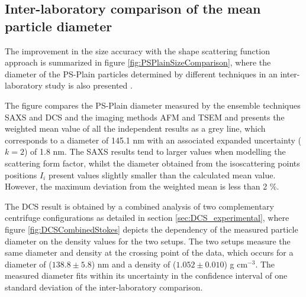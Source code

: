 \subsection{Inter-laboratory comparison of the mean particle diameter}
\label{sec:interlab_size_comparison}
The improvement in the size accuracy with the shape scattering function approach is summarized in figure \ref{fig:PSPlainSizeComparison}, where the diameter of the PS-Plain particles determined by different techniques in an inter-laboratory study is also presented \citep{nicolet_inter-laboratory_2016}.

\begin{figure*}
	\centering
		
	\caption[Comparison of the PS-Plain particles average diameter with different techniques.]{Comparison of the PS-Plain average diameter obtained with different techniques, where the errorbars correspond to the expanded uncertainty ($k=2$). The circles correspond to results obtained with SAXS in the FCM beamline and the diamond to combined DCS measurements performed in NPL. The gray line defines the weighted mean of all the independent results, employing in the case of SAXS the shape scattering function result. The microscopy values are obtained from Belgian Service Métrologie-Metrologische Dienst (SMD), Swiss Federal Institute of Metrology (METAS) and Dutch Metrology Institute (VSL).}
	\label{fig:PSPlainSizeComparison}
\end{figure*}

The figure compares the PS-Plain diameter measured by the ensemble techniques SAXS and DCS and the imaging methods AFM and TSEM and presents the weighted mean value of all the independent results as a grey line, which corresponds to a diameter of 145.1 nm with an associated expanded uncertainty ($k=2$) of 1.8 nm. The SAXS results tend to larger values when modelling the scattering form factor, whilst the diameter obtained from the isoscattering points positions $I_i$ present values slightly smaller than the calculated mean value. However, the maximum deviation from the weighted mean is less than 2 $\%$.

The DCS result is obtained by a combined analysis of two complementary centrifuge configurations as detailed in section \ref{sec:DCS_experimental}, where figure \ref{fig:DCSCombinedStokes} depicts the dependency of the measured particle diameter on the density values for the two setups. The two setups measure the same diameter and density at the crossing point of the data, which occurs for a diameter of ($138.8\pm5.8$) nm and a density of ($1.052\pm0.010$) g cm$^{-3}$. The measured diameter fits within its uncertainty in the confidence interval of one standard deviation of the inter-laboratory comparison.

